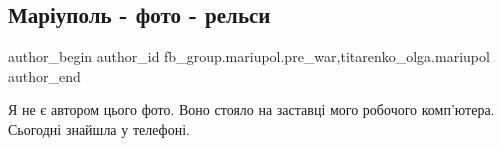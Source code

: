  
 
 
 
 

\subsection{Маріуполь - фото - рельси}
\label{sec:15_02_2023.fb.fb_group.mariupol.pre_war.4.mar_upol___foto___re}
 
\ifcmt
 author_begin
   author_id fb_group.mariupol.pre_war,titarenko_olga.mariupol
 author_end
\fi

Я не є автором цього фото. Воно стояло на заставці мого робочого комп'ютера.
Сьогодні знайшла у телефоні.

